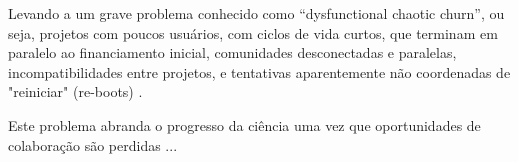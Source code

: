 Levando a um grave problema conhecido como ``dysfunctional chaotic churn'', ou
seja, projetos com poucos usuários, com ciclos de vida curtos, que terminam em
paralelo ao financiamento inicial, comunidades desconectadas e paralelas,
incompatibilidades entre projetos, e tentativas aparentemente não coordenadas
de "reiniciar" (re-boots) \cite{howison2015understanding}.

Este problema abranda o progresso da ciência uma vez que oportunidades de
colaboração são perdidas \cite{stewart2010cyberinfrastructure} ...

%
%
%
%
%
%
%
%
